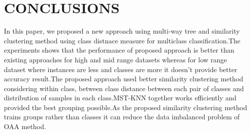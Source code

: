 \documentclass[a4paper, 10pt, conference]{ieeeconf}      %
\begin{document}
\section{CONCLUSIONS}
In this paper, we proposed a new approach using multi-way tree and similarity clustering method using class distnace measure for multiclass classification.The experiments shows that the performance of proposed approach is better than existing approaches for high and mid range datasets whereas for low range dataset where instances are less and classes are more it doesn't provide better accuracy result.The proposed approach used better similarity clustering method considering within class, between class distance between each pair of classes and distribution of samples in each class.MST-KNN together works efficiently and provided the best grouping possible.As the proposed similarity clustering method trains groups rather than classes it can reduce the data imbalanced problem of OAA method.  


\addtolength{\textheight}{-12cm}   %







\end{document}
